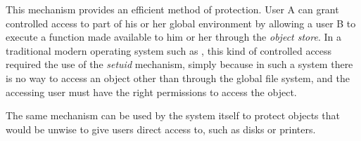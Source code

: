 This mechanism provides an efficient method of protection.  User A
can grant controlled access to part of his or her global environment
by allowing a user B to execute a function made available to him or
her through the \emph{object store}.   In a
traditional modern operating system such as \unix{}, this kind of
controlled access required the use of the \emph{setuid} mechanism,
simply because in such a system there is no way to access an object
other than through the global file system, and the accessing user must
have the right permissions to access the object.

The same mechanism can be used by the system itself to protect objects
that would be unwise to give users direct access to, such as disks or
printers. 


